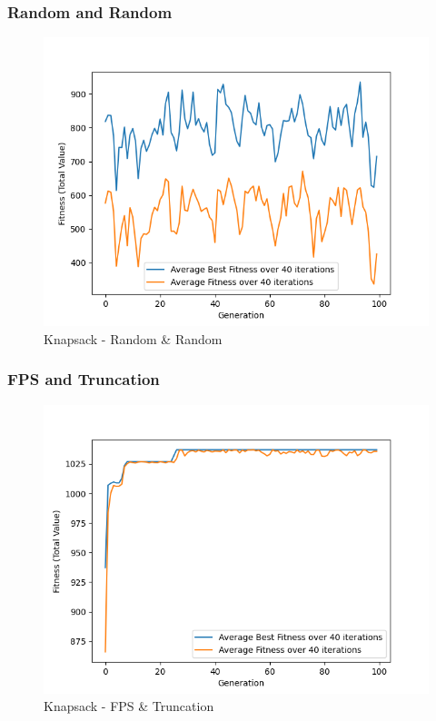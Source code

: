 \documentclass[11pt, letterpaper]{article}
\begin{document}
\subsubsection {Random and Random}
\begin{figure}[H]
    \centering
    \includegraphics[scale = 0.6]{images/knapsack_rd_rd.png}
    \caption {Knapsack - Random \& Random}
    \label {fig:kpRR}
\end{figure}

\subsubsection {FPS and Truncation}
\begin{figure}[H]
    \centering
    \includegraphics[scale = 0.6]{images/knapsack_fp_tr.png}
    \caption {Knapsack - FPS \& Truncation}
    \label {fig:kpFT}
\end{figure}
\end{document}
